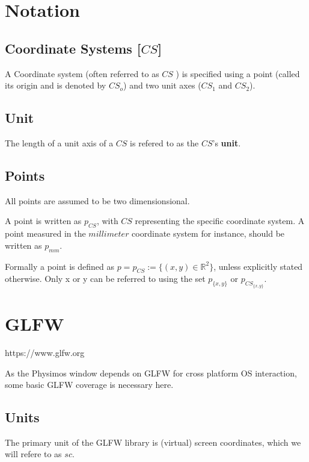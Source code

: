 \documentclass[12pt]{article}
\begin{document}
\tableofcontents

\section{Notation}

\subsection{Coordinate Systems [$CS$]}

A Coordinate system (often referred to as $CS$ ) is specified using a point (called its origin and is denoted by $CS_o$) and two unit axes ($CS_1$ and $CS_2$). 


\subsection{Unit}

The length of a unit axis of a $CS$ is refered to as the $CS$'s \textbf{unit}.


\subsection{Points}

All points are assumed to be two dimensionsional.

A point is written as $p_{CS}$, with $CS$ representing the specific coordinate system. A point measured in the $millimeter$ coordinate system for instance, should be written as  $p_{mm}$.

Formally a point is defined as $p = p_{CS} := \{(x, y) \in \mathbb{R}^2\}$, unless explicitly stated otherwise. Only x or y can be referred to using the set $p_{\{x, y\}}$ or $p_{CS_{\{x, y\}}}$.

\section{GLFW}

https://www.glfw.org

As the Physimos window depends on GLFW for cross platform OS interaction, some basic GLFW coverage is necessary here.

\subsection{Units}

The primary unit of the GLFW library is (virtual) screen coordinates, which we will refere to as $sc$.
\end{document}
